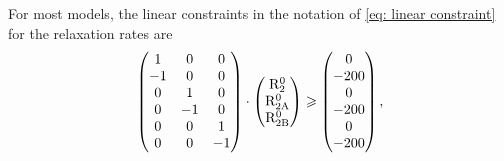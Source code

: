 For most models, the linear constraints in the notation of \eqref{eq: linear constraint} for the relaxation rates are
\begin{equation}
    \begin{pmatrix}
        1 & 0 & 0 \\
       -1 & 0 & 0 \\
        0 & 1 & 0 \\
        0 &-1 & 0 \\
        0 & 0 & 1 \\
        0 & 0 &-1 \\
    \end{pmatrix}
    \cdot
    \begin{pmatrix}
        \mathrm{R}_2^0 \\
        \mathrm{R}_{\mathrm{2A}}^0 \\
        \mathrm{R}_{\mathrm{2B}}^0 \\
    \end{pmatrix}
    \geqslant
    \begin{pmatrix}
        0 \\
        -200 \\
        0 \\
        -200 \\
        0 \\
        -200 \\
    \end{pmatrix},
\end{equation}

